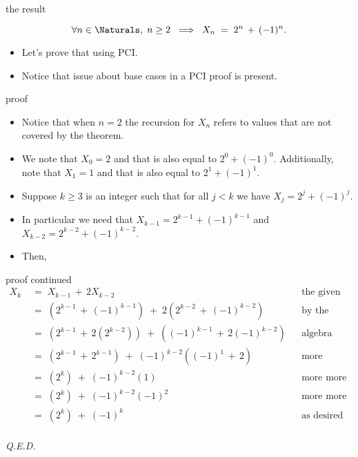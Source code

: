 \documentclass[handout,landscape]{beamer}
\begin{document}
\begin{frame}{the result}
\begin{thm*}
\[ \forall n \in \Naturals, \; n \geq 2 \; \implies \; X_n  \; = \; 2^n \, + \, (-1)^n. \]
\end{thm*}
\pause
\begin{itemize}
\item Let's prove that using PCI. \pause
\item Notice that issue about base cases in a PCI proof is present.
\end{itemize}
\end{frame}

\begin{frame}{proof}
\begin{itemize}
\item Notice that when $n=2$ the recursion for $X_n$ refers to values that are not covered by the theorem. \pause
\item We note that $X_0 = 2$ and that is also equal to $2^0+(-1)^0$. Additionally, note that $X_1 = 1$ and that is also equal to $2^1 + (-1)^1$. \pause
\item Suppose $k \geq 3$ is an integer such that for all $j<k$ we have $X_j = 2^j+(-1)^j$. \pause
\item In particular we need that $X_{k-1} = 2^{k-1}+(-1)^{k-1}$ and $X_{k-2} = 2^{k-2}+(-1)^{k-2}$. \pause
\item Then, 
\end{itemize}
\end{frame}

\begin{frame}{proof continued}
\begin{align*}
X_k \; &= \; X_{k-1} \, + \, 2 X_{k-2} & & \mbox{the given recurrence} \\
       &= \; (2^{k-1}\,+\,(-1)^{k-1}) \; + \; 2(2^{k-2}\,+\,(-1)^{k-2}) & & \mbox{by the inductive hypothesis}\\
       &= \; (2^{k-1}\,+\,2(2^{k-2})) \; + \; ((-1)^{k-1}\,+\,2(-1)^{k-2}) & & \mbox{algebra}\\
       &= \; (2^{k-1}\,+\,2^{k-1}) \; + \; (-1)^{k-2}((-1)^1\,+\,2) & & \mbox{more algebra}\\
       &= \; (2^{k}) \; + \; (-1)^{k-2}(1) & & \mbox{more more algebra}\\
       &= \; (2^{k}) \; + \; (-1)^{k-2}(-1)^2 & & \mbox{more more more algebra}\\
       &= \; (2^{k}) \; + \; (-1)^{k} & & \mbox{as desired}\\
\end{align*}

\hfill {\em Q.E.D.}

\end{frame}
\end{document}
